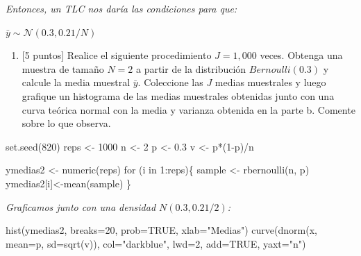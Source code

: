 \documentclass[
  letterpaper,
  DIV=11,
  numbers=noendperiod]{scrartcl}
\newenvironment{Shaded}{\begin{snugshade}}{\end{snugshade}}
\newcommand{\AttributeTok}[1]{\textcolor[rgb]{0.40,0.45,0.13}{#1}}
\newcommand{\ConstantTok}[1]{\textcolor[rgb]{0.56,0.35,0.01}{#1}}
\newcommand{\ControlFlowTok}[1]{\textcolor[rgb]{0.00,0.23,0.31}{#1}}
\newcommand{\DecValTok}[1]{\textcolor[rgb]{0.68,0.00,0.00}{#1}}
\newcommand{\FloatTok}[1]{\textcolor[rgb]{0.68,0.00,0.00}{#1}}
\newcommand{\FunctionTok}[1]{\textcolor[rgb]{0.28,0.35,0.67}{#1}}
\newcommand{\NormalTok}[1]{\textcolor[rgb]{0.00,0.23,0.31}{#1}}
\newcommand{\OtherTok}[1]{\textcolor[rgb]{0.00,0.23,0.31}{#1}}
\newcommand{\SpecialCharTok}[1]{\textcolor[rgb]{0.37,0.37,0.37}{#1}}
\newcommand{\StringTok}[1]{\textcolor[rgb]{0.13,0.47,0.30}{#1}}
\providecommand{\tightlist}{%
  \setlength{\itemsep}{0pt}\setlength{\parskip}{0pt}}\usepackage{longtable,booktabs,array}
\begin{document}
\emph{Entonces, un TLC nos daría las condiciones para que:}

\emph{\(\bar{y}\sim\mathcal{N}(0.3,0.21/N)\)}

\begin{enumerate}
\def\labelenumi{\alph{enumi}.}
\tightlist
\item
  {[}5 puntos{]} Realice el siguiente procedimiento \(J=1,000\) veces.
  Obtenga una muestra de tamaño \(N=2\) a partir de la distribución
  \(Bernoulli(0.3)\) y calcule la media muestral \(\bar{y}\). Coleccione
  las \(J\) medias muestrales y luego grafique un histograma de las
  medias muestrales obtenidas junto con una curva teórica normal con la
  media y varianza obtenida en la parte b. Comente sobre lo que observa.
\end{enumerate}

\begin{Shaded}
\begin{Highlighting}[]
\FunctionTok{set.seed}\NormalTok{(}\DecValTok{820}\NormalTok{)}
\NormalTok{reps }\OtherTok{\textless{}{-}} \DecValTok{1000}
\NormalTok{n }\OtherTok{\textless{}{-}} \DecValTok{2}
\NormalTok{p }\OtherTok{\textless{}{-}} \FloatTok{0.3}
\NormalTok{v }\OtherTok{\textless{}{-}}\NormalTok{ p}\SpecialCharTok{*}\NormalTok{(}\DecValTok{1}\SpecialCharTok{{-}}\NormalTok{p)}\SpecialCharTok{/}\NormalTok{n}

\NormalTok{ymedias2 }\OtherTok{\textless{}{-}} \FunctionTok{numeric}\NormalTok{(reps)}
\ControlFlowTok{for}\NormalTok{ (i }\ControlFlowTok{in} \DecValTok{1}\SpecialCharTok{:}\NormalTok{reps)\{}
\NormalTok{ sample }\OtherTok{\textless{}{-}} \FunctionTok{rbernoulli}\NormalTok{(n, p)}
\NormalTok{ ymedias2[i]}\OtherTok{\textless{}{-}}\FunctionTok{mean}\NormalTok{(sample)}
\NormalTok{\}}
\end{Highlighting}
\end{Shaded}

\emph{Graficamos junto con una densidad \(N(0.3, 0.21/2)\):}

\begin{Shaded}
\begin{Highlighting}[]
\FunctionTok{hist}\NormalTok{(ymedias2, }\AttributeTok{breaks=}\DecValTok{20}\NormalTok{, }\AttributeTok{prob=}\ConstantTok{TRUE}\NormalTok{, }
     \AttributeTok{xlab=}\StringTok{"Medias"}\NormalTok{)}
\FunctionTok{curve}\NormalTok{(}\FunctionTok{dnorm}\NormalTok{(x, }\AttributeTok{mean=}\NormalTok{p, }\AttributeTok{sd=}\FunctionTok{sqrt}\NormalTok{(v)), }
      \AttributeTok{col=}\StringTok{"darkblue"}\NormalTok{, }\AttributeTok{lwd=}\DecValTok{2}\NormalTok{, }\AttributeTok{add=}\ConstantTok{TRUE}\NormalTok{, }\AttributeTok{yaxt=}\StringTok{"n"}\NormalTok{)}
\end{Highlighting}
\end{Shaded}
\end{document}
